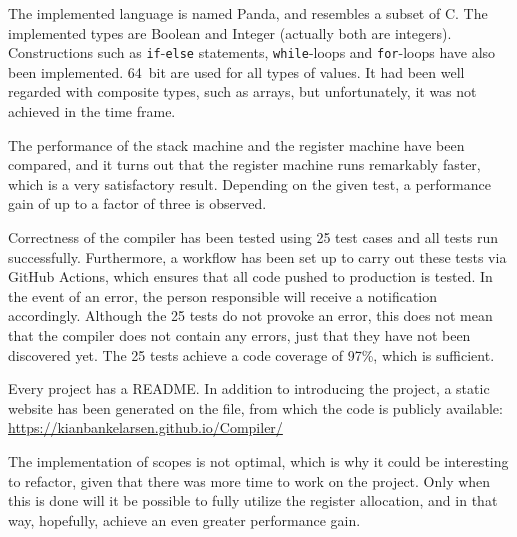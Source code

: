 The implemented language is named Panda, and resembles a subset of C. The implemented types are Boolean and Integer (actually both are integers). Constructions such as \texttt{if}-\texttt{else} statements, \texttt{while}-loops and \texttt{for}-loops have also been implemented. \SI{64}{bit} are used for all types of values. It had been well regarded with composite types, such as arrays, but unfortunately, it was not achieved in the time frame.

The performance of the stack machine and the register machine have been compared, and it turns out that the register machine runs remarkably faster, which is a very satisfactory result. Depending on the given test, a performance gain of up to a factor of three is observed.

Correctness of the compiler has been tested using 25 test cases and all tests run successfully. Furthermore, a workflow has been set up to carry out these tests via GitHub Actions, which ensures that all code pushed to production is tested. In the event of an error, the person responsible will receive a notification accordingly. Although the 25 tests do not provoke an error, this does not mean that the compiler does not contain any errors, just that they have not been discovered yet. The 25 tests achieve a code coverage of 97\%, which is sufficient.

Every project has a README. In addition to introducing the project, a static website has been generated on the file, from which the code is publicly available: \url{https://kianbankelarsen.github.io/Compiler/}

The implementation of scopes is not optimal, which is why it could be interesting to refactor, given that there was more time to work on the project. Only when this is done will it be possible to fully utilize the register allocation, and in that way, hopefully, achieve an even greater performance gain.

\cleardoublepage
{}
{}
\printbibliography
